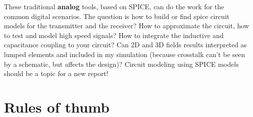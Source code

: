 \documentclass[final]{cubedoc}
\begin{document}
	
	
	These traditional \textbf{analog} tools, based on SPICE, can do the work for the common digital scenarios. The question is how to build or find spice circuit models for the transmitter and the receiver? How to approximate the circuit, how to test and model high speed signals? How to integrate the inductive and capacitance coupling to your circuit? Can 2D and 3D fields results interpreted as lumped elements and included in my simulation (because crosstalk can't be seen by a schematic, but affects the design)? Circuit modeling using SPICE models should be a topic for a new report!
	
	
	
	\section{Rules of thumb}
	
\end{document}
